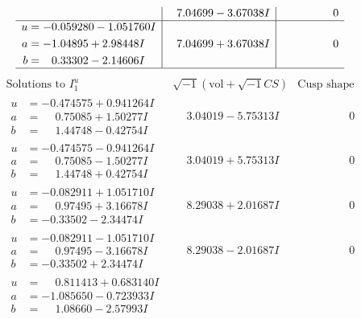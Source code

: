 \documentclass[1p]{elsarticle_modified}
\theoremstyle{definition}
\newcommand{\I}{\sqrt{-1}}
\begin{document}
$$\begin{array}{c|c|c}
 & \phantom{-}7.04699 - 3.67038 I & \phantom{-0.000000 } 0 \\ \hline\begin{aligned}
u &= -0.059280 - 1.051760 I \\
a &= -1.04895 + 2.98448 I \\
b &= \phantom{-}0.33302 - 2.14606 I\end{aligned}
 & \phantom{-}7.04699 + 3.67038 I & \phantom{-0.000000 } 0\\
 \hline 
 \end{array}$$\newpage$$\begin{array}{c|c|c}  
\text{Solutions to }I^u_{1}& \I (\text{vol} + \sqrt{-1}CS) & \text{Cusp shape}\\
 \hline 
\begin{aligned}
u &= -0.474575 + 0.941264 I \\
a &= \phantom{-}0.75085 + 1.50277 I \\
b &= \phantom{-}1.44748 - 0.42754 I\end{aligned}
 & \phantom{-}3.04019 - 5.75313 I & \phantom{-0.000000 } 0 \\ \hline\begin{aligned}
u &= -0.474575 - 0.941264 I \\
a &= \phantom{-}0.75085 - 1.50277 I \\
b &= \phantom{-}1.44748 + 0.42754 I\end{aligned}
 & \phantom{-}3.04019 + 5.75313 I & \phantom{-0.000000 } 0 \\ \hline\begin{aligned}
u &= -0.082911 + 1.051710 I \\
a &= \phantom{-}0.97495 + 3.16678 I \\
b &= -0.33502 - 2.34474 I\end{aligned}
 & \phantom{-}8.29038 + 2.01687 I & \phantom{-0.000000 } 0 \\ \hline\begin{aligned}
u &= -0.082911 - 1.051710 I \\
a &= \phantom{-}0.97495 - 3.16678 I \\
b &= -0.33502 + 2.34474 I\end{aligned}
 & \phantom{-}8.29038 - 2.01687 I & \phantom{-0.000000 } 0 \\ \hline\begin{aligned}
u &= \phantom{-}0.811413 + 0.683140 I \\
a &= -1.085650 - 0.723933 I \\
b &= \phantom{-}1.08660 - 2.57993 I\end{aligned}

\end{array}$$
\end{document}
